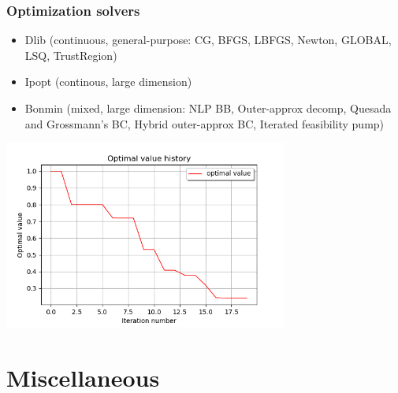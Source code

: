 \documentclass{beamer}
\begin{document}
\begin{frame}
\frametitle{Optimization solvers}


\begin{itemize}
\item Dlib (continuous, general-purpose: CG, BFGS, LBFGS, Newton, GLOBAL, LSQ, TrustRegion)
\item Ipopt (continous, large dimension)
\item Bonmin (mixed, large dimension: NLP BB, Outer-approx decomp, Quesada and Grossmann’s BC, Hybrid outer-approx BC, Iterated feasibility pump)
\end{itemize}

% 
\begin{center}
\includegraphics[width=0.7\textwidth]{figures/optim.png}
\end{center}

\end{frame}


% 
% 
% 
% 

\section{Miscellaneous}

\end{document}

